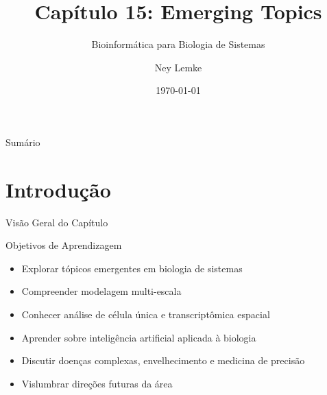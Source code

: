


\title[Cap. 15: Emerging Topics]{Capítulo 15: Emerging Topics}
\subtitle{Bioinformática para Biologia de Sistemas}
\author{Ney Lemke}
\date{\today}



\begin{frame}
\titlepage
\end{frame}

\begin{frame}{Sumário}
\tableofcontents
\end{frame}

\section{Introdução}

\begin{frame}{Visão Geral do Capítulo}
\begin{block}{Objetivos de Aprendizagem}
\begin{itemize}
    \item Explorar tópicos emergentes em biologia de sistemas
    \item Compreender modelagem multi-escala
    \item Conhecer análise de célula única e transcriptômica espacial
    \item Aprender sobre inteligência artificial aplicada à biologia
    \item Discutir doenças complexas, envelhecimento e medicina de precisão
    \item Vislumbrar direções futuras da área
\end{itemize}
\end{block}

\vspace{0.3cm}

\end{frame}

